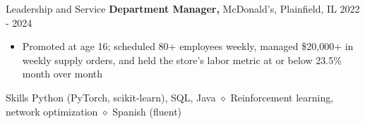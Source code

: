 \documentclass{resume}
\begin{document}
\begin{rSection}{Leadership and Service}
{\textbf{Department Manager,} McDonald's, Plainfield, IL} \hfill {2022 - 2024}
\vspace{-5pt}
\begin{itemize}
\setlength\itemsep{-1.5ex}
    \item Promoted at age 16; scheduled 80+ employees weekly, managed \$20,000+ in weekly supply orders, and held the store's labor metric at or below 23.5\% month over month
\end{itemize}
\end{rSection}

\begin{rSection}{Skills}
    Python (PyTorch, scikit-learn), SQL, Java $\diamond$ Reinforcement learning, network optimization $\diamond$ Spanish (fluent)
\end{rSection}
\end{document}

